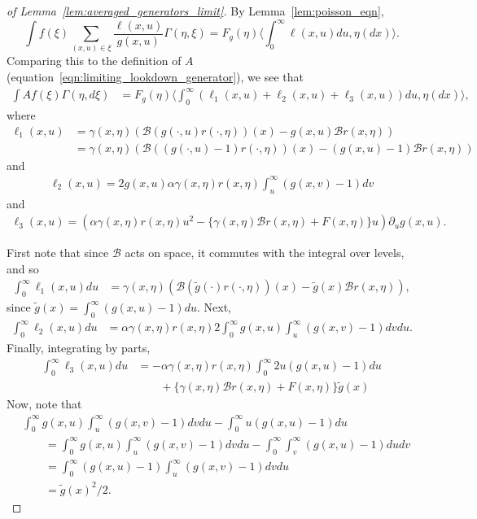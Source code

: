 \documentclass[EJP]{ejpecp} %
\newcommand{\DG}{\mathcal{B}}  %
\newcommand{\lp}{\xi}              %
\begin{document}
\begin{proof}[of Lemma~\ref{lem:averaged_generators_limit}]
By Lemma~\ref{lem:poisson_eqn},
$$
    \int f(\lp) \sum_{(x,u)\in\lp} \frac{\ell(x,u)}{g(x,u)} \Gamma(\eta, \lp)
    =
    F_g(\eta) \bigg\langle \int_0^\infty \ell(x,u) du , \eta(dx) \bigg\rangle .
$$
Comparing this to the definition of $A$
(equation~\eqref{eqn:limiting_lookdown_generator}),
we see that
\begin{align*}
    \int Af(\lp) \Gamma(\eta,d\lp)
    &=
    F_g(\eta) \bigg\langle
        \int_0^\infty
        (\ell_1(x,u) + \ell_2(x,u) + \ell_3(x,u))
        du, \eta(dx)
    \bigg\rangle ,
\end{align*}
where
\begin{align*}
    \ell_1(x,u)
    &=
    \gamma(x,\eta)\left(
        \DG(g(\cdot,u) r(\cdot,\eta))(x) - g(x,u) \DG r(x,\eta)
    \right) \\
    &=
    \gamma(x,\eta)\left(
        \DG((g(\cdot,u)-1) r(\cdot,\eta))(x) - (g(x,u)-1) \DG r(x,\eta)
    \right)
\end{align*}
and
\begin{align*}
    \ell_2(x,u)
    =
    2 g(x,u) \alpha \gamma(x,\eta) r(x,\eta) \int_u^\infty(g(x,v) - 1)dv
\end{align*}
and
\begin{align*}
    \ell_3(x,u)
    =
    \left( \alpha \gamma(x,\eta)r(x,\eta)u^2 - \{\gamma(x,\eta)\DG r(x,\eta) + F(x,\eta)\} u \right)
    \partial_u g(x,u) .
\end{align*}

First note that since $\DG$ acts on space, it commutes with the integral over levels, and so
\begin{align*}
    \int_0^\infty \ell_1(x,u) du
    &=
    \gamma(x,\eta)\left(
        \DG(\widetilde{g}(\cdot) r(\cdot,\eta))(x) - \widetilde{g}(x) \DG r(x,\eta)
    \right) ,
\end{align*}
since $\widetilde{g}(x) = \int_0^\infty (g(x,u) - 1) du$.
Next,
\begin{align*}
    \int_0^\infty \ell_2(x,u) du
    &=
    \alpha \gamma(x,\eta) r(x,\eta) 2\int_0^\infty g(x,u) \int_u^\infty (g(x,v)-1) dv du .
\end{align*}
Finally, integrating by parts,
\begin{align*}
    \int_0^\infty \ell_3(x,u) du
    &=
    - \alpha \gamma(x,\eta) r(x,\eta) \int_0^\infty 2u(g(x,u) - 1) du
    \\ & \qquad {}
    + \{ \gamma(x,\eta) \DG r(x,\eta) + F(x,\eta) \} \widetilde{g}(x)
\end{align*}
Now, note that
\begin{align*}
&
    \int_0^\infty g(x,u) \int_u^\infty (g(x,v)-1) dv du - \int_0^\infty u(g(x,u)-1)du
\\ & \qquad =
    \int_0^\infty g(x,u) \int_u^\infty (g(x,v)-1) dv du - \int_0^\infty \int_v^\infty (g(x,u) -1) du dv
\\ & \qquad =
    \int_0^\infty (g(x,u)-1) \int_u^\infty (g(x,v)-1) dv du
\\ & \qquad =
    \widetilde{g}(x)^2/2 .
\end{align*}


\end{proof}
\end{document}

